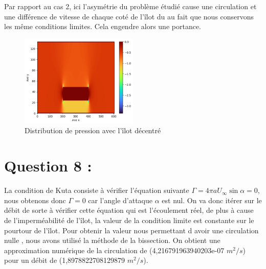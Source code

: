 \documentclass{article}
\begin{document}
 Par rapport au cas 2, ici l'asymétrie du problème étudié cause une circulation et une différence de vitesse de chaque coté de l'îlot du au fait que nous conservons les même conditions limites. Cela engendre alors une portance.

\begin{figure}[h]
        \centering
        \includegraphics[width=0.5\textwidth]{"../pictures/pressure3.png"}
        \caption{Distribution de pression avec l'îlot décentré   }
    \end{figure}



\section*{Question 8 :}

La condition de Kuta consiste à vérifier l'équation suivante $\Gamma=4\pi a U_{\infty}\sin\alpha=0$, nous obtenons donc $\Gamma=0$ car l'angle d'attaque $\alpha$ est nul. On va donc itérer sur le débit de sorte à vérifier cette équation qui est l'écoulement réel, de plus à cause de l'imperméabilité de l'îlot, la valeur de la condition limite est constante sur le pourtour de l'îlot. Pour obtenir la valeur nous permettant d avoir une circulation nulle , nous avons utilisé la méthode de la bissection. On obtient une approximation numérique de la circulation de (4,216791963940203e-07 $m^2/s$) pour un débit de (1,8978822708129879 $m^2/s$).
\end{document}
